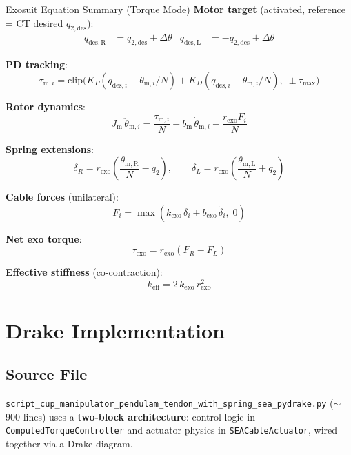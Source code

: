 \documentclass[11pt,a4paper]{article}
\newcommand{\Jm}{J_{\mathrm{m}}}
\begin{document}
\begin{archbox}{Exosuit Equation Summary (Torque Mode)}
\textbf{Motor target} (activated, reference = CT desired $q_{2,\mathrm{des}}$):
\begin{align*}
    q_{\mathrm{des,R}} &= q_{2,\mathrm{des}} + \Delta\theta &
    q_{\mathrm{des,L}} &= -q_{2,\mathrm{des}} + \Delta\theta
\end{align*}

\textbf{PD tracking}:
\[
    \tau_{\mathrm{m},i} = \mathrm{clip}\!\bigl(
        K_P(q_{\mathrm{des},i} - \theta_{\mathrm{m},i}/N)
      + K_D(\dot{q}_{\mathrm{des},i} - \dot{\theta}_{\mathrm{m},i}/N),\;
      \pm\tau_{\max}\bigr)
\]

\textbf{Rotor dynamics}:
\[
    \Jm\,\ddot{\theta}_{\mathrm{m},i}
      = \frac{\tau_{\mathrm{m},i}}{N}
      - b_{\mathrm{m}}\,\dot{\theta}_{\mathrm{m},i}
      - \frac{r_{\mathrm{exo}} F_i}{N}
\]

\textbf{Spring extensions}:
\[
    \delta_R = r_{\mathrm{exo}}\!\left(\frac{\theta_{\mathrm{m,R}}}{N} - q_2\right), \qquad
    \delta_L = r_{\mathrm{exo}}\!\left(\frac{\theta_{\mathrm{m,L}}}{N} + q_2\right)
\]

\textbf{Cable forces} (unilateral):
\[
    F_i = \max(k_{\mathrm{exo}}\,\delta_i + b_{\mathrm{exo}}\,\dot{\delta}_i,\; 0)
\]

\textbf{Net exo torque}:
\[
    \tau_{\mathrm{exo}} = r_{\mathrm{exo}} (F_R - F_L)
\]

\textbf{Effective stiffness} (co-contraction):
\[
    k_{\mathrm{eff}} = 2\,k_{\mathrm{exo}}\,r_{\mathrm{exo}}^2
\]
\end{archbox}


\section{Drake Implementation}
\label{sec:drake}

\subsection{Source File}

\texttt{script\_cup\_manipulator\_pendulam\_tendon\_with\_spring\_sea\_pydrake.py} ($\sim$900 lines) uses a \textbf{two-block architecture}: control logic in \texttt{ComputedTorqueController} and actuator physics in \texttt{SEACableActuator}, wired together via a Drake diagram.
\end{document}
